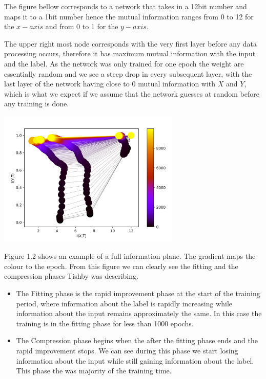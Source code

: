 The figure bellow corresponds to a network that takes in a 12bit number and maps
it to a 1bit number hence the mutual information ranges from 0 to 12 for the $
x-axis $ and from 0 to 1 for the $ y-axis $.

The upper right most node corresponds with the very first layer before any data
processing occurs, therefore it has maximum mutual information with the input
and the label. As the network was only trained for one epoch the weight are
essentially random and we see a steep drop in every subsequent layer, with the
last layer of the network having close to 0 mutual information with $ X $ and $
Y $, which is what we expect if we assume that the network guesses at random
before any training is done.

\begin{center}
  \includegraphics[width=0.65\textwidth]{figs/ip_10000.png}
\end{center}

Figure 1.2 shows an example of a full information plane. The gradient maps the
colour to the epoch. From this figure we can clearly see the fitting and the
compression phases Tishby was describing. 

\begin{itemize}
  \item{
      The Fitting phase is the rapid improvement phase at the start of the
      training period, where information about the label is rapidly increasing
      while information about the input remains approximately the same. In this
      case the training is in the fitting phase for less than 1000 epochs.
    }
  \item{
      The Compression phase begins when the after the fitting phase ends and the
      rapid improvement stops. We can see during this phase we start losing
      information about the input while still gaining information about the
      label. This phase the was majority of the training time.
    }
\end{itemize}
